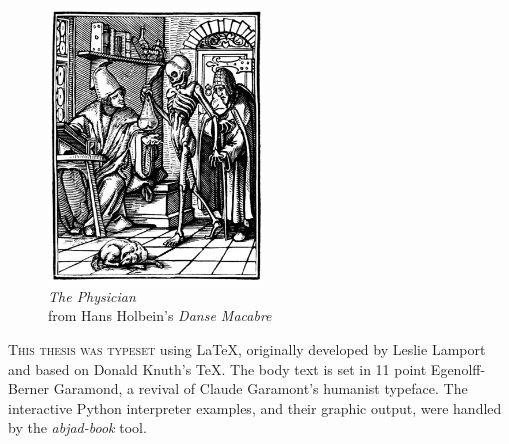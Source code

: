 \newpage

\begin{figure}
    \vspace{50pt}
    \centering
    \includegraphics[width=0.51\textwidth]{assets/holbein-physician.jpg}
    \\
    \emph{The Physician}
    \\
    from Hans Holbein's \emph{Danse Macabre}
\end{figure}

\begin{center}
\parbox{200pt}{\lettrine[lines=3,slope=-2pt,nindent=-4pt]{\textcolor{SchoolColor}{T}}{his
thesis was typeset} using \LaTeX, originally developed by Leslie Lamport and
based on Donald Knuth's \TeX. The body text is set in 11 point Egenolff-Berner
Garamond, a revival of Claude Garamont's humanist typeface. The interactive
Python interpreter examples, and their graphic output, were handled by the
\emph{abjad-book} tool. }
\end{center}